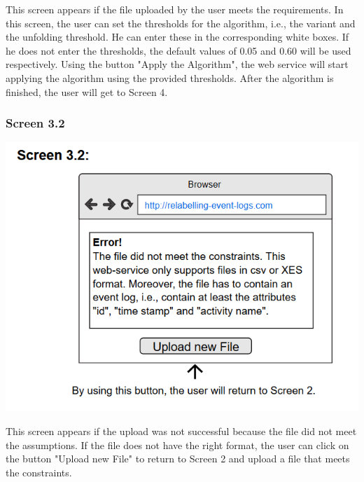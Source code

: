 \documentclass[notitlepage]{article}
\begin{document}
\begin{flushleft}
This screen appears if the file uploaded by the user meets the requirements. In this screen, the user can set the thresholds for the algorithm, i.e., the variant and the unfolding threshold. He can enter these in the corresponding white boxes. If he does not enter the thresholds, the default values of 0.05 and 0.60 will be used respectively. Using the button "Apply the Algorithm", the web service will start applying the algorithm using the provided thresholds. After the algorithm is finished, the user will get to Screen 4.

\subsubsection{Screen 3.2}
\includegraphics[scale=0.8]{InterfaceMockup3-2.png}

This screen appears if the upload was not successful because the file did not meet the assumptions. If the file does not have the right format, the user can click on the button "Upload new File" to return to Screen 2 and upload a file that meets the constraints.



\end{flushleft}
\end{document}
